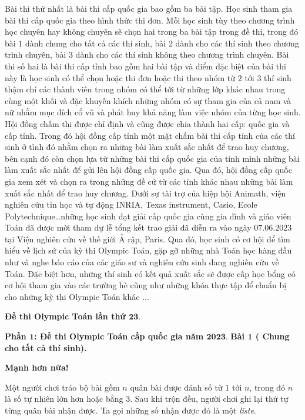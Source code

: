 \begin{multicols}{2}
\begin{figure}[H]
		\vspace*{-15pt}
	\end{figure}
	Bài thi thứ nhất là bài thi cấp quốc gia bao gồm ba bài tập. Học sinh tham gia bài thi cấp quốc gia theo hình thức thi đơn. Mỗi học sinh tùy theo chương trình học chuyên hay không chuyên sẽ chọn hai trong ba bài tập trong đề thi, trong đó bài $1$ dành chung cho tất cả các thí sinh, bài $2$ dành cho các thí sinh theo chương trình chuyên, bài $3$ dành cho các thí sinh không theo chương trình chuyên. 
	\vskip 0.1cm
	Bài thi số hai là bài thi cấp tỉnh bao gồm hai bài tập và điểm đặc biệt của bài thi này là học sinh có thể chọn hoặc thi đơn hoặc thi theo nhóm từ $2$ tới $3$ thí sinh thậm chí các thành viên trong nhóm có thể tới từ những lớp khác nhau trong cùng một khối và đặc khuyến khích những nhóm có sự tham gia của cả nam và nữ nhằm mục đích cổ vũ và phát huy khả năng làm việc nhóm của từng học sinh. 
	\vskip 0.1cm
	Hội đồng chấm thi được chỉ định và cũng được chia thành hai cấp: quốc gia và cấp tỉnh. Trong đó hội đồng cấp tỉnh một mặt chấm bài thi cấp tỉnh của các thí sinh ở tỉnh đó nhằm chọn ra những bài làm xuất sắc nhất để trao huy chương, bên cạnh đó còn chọn lựa từ những bài thi cấp quốc gia của tỉnh mình những bài làm xuất sắc nhất để gửi lên hội đồng cấp quốc gia. Qua đó, hội đồng cấp quốc gia xem xét và chọn ra trong những đề cử từ các tỉnh khác nhau những bài làm xuất sắc nhất để trao huy chương. 
	\vskip 0.1cm
	Dưới sự tài trợ của hiệp hội Animath, viện nghiên cứu tin học và tự động  INRIA, Texas instrument, Casio, Ecole Polytechnique…những học sinh đạt giải cấp quốc gia cùng gia đình và giáo viên Toán đã được mời tham dự lễ tổng kết trao giải đã diễn ra vào ngày $07.06.2023$ tại Viện nghiên cứu về thế giới Ả rập, Paris. Qua đó, học sinh có cơ hội để tìm hiểu về lịch sử của kỳ thi Olympic Toán, gặp gỡ những nhà Toán học hàng đầu như và nghe báo cáo của các giáo sư và nghiên cứu sinh đang nghiên cứu về Toán. Đặc biệt hơn, những thí sinh có kết quả xuất sắc sẽ được cấp học bổng có cơ hội tham gia vào các trường hè cũng như những khóa thực tập để chuẩn bị cho những kỳ thi Olympic Toán khác ...
	\vskip 0.1cm
	\centerline{\textbf{\color{cackithi}Đề thi Olympic Toán lần thứ $\pmb{23.}$}}
	\vskip 0.1cm
	 \textbf{\color{cackithi}Phần $\pmb{1}$: Đề thi Olympic Toán cấp quốc gia năm $\pmb{2023.}$}
	\vskip 0.1cm
	 \textbf{\color{cackithi}Bài $\pmb{1}$ ( Chung cho tất cả thí sinh).}
	\vskip 0.1cm 
	\centerline{ \textbf{\color{cackithi}Mạnh hơn nữa!}}
	\vskip 0.1cm
	Một người chơi tráo bộ bài gồm $n$ quân bài được đánh số từ $1$ tới $n$, trong đó $n$ là số tự nhiên lớn hơn hoặc bằng $3$. Sau khi trộn đều, người chơi ghi lại thứ tự từng quân bài nhận được. Ta gọi những số nhận được đó là một \textit{liste}.

\end{multicols}

